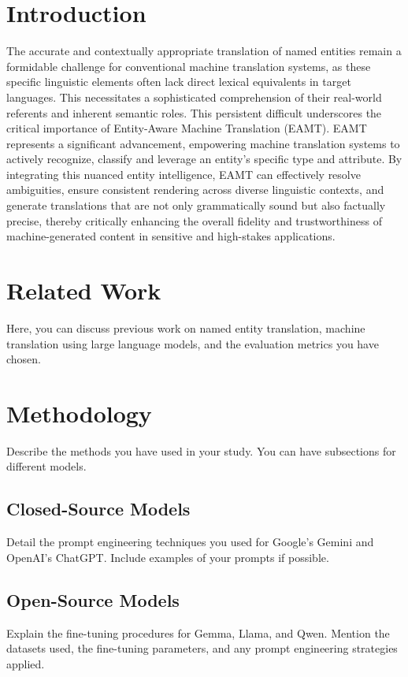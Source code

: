 \documentclass{ecai}
\begin{document}
\section{Introduction}
\label{sec:intro}
The accurate and contextually appropriate translation of named entities remain a formidable challenge
for conventional machine translation systems, as these specific linguistic elements often lack direct
lexical equivalents in target languages. This necessitates a sophisticated comprehension of their real-world
referents and inherent semantic roles. This persistent difficult underscores the critical importance of Entity-Aware
Machine Translation (EAMT). EAMT represents a significant advancement, empowering machine translation systems to actively
recognize, classify and leverage an entity's specific type and attribute. By integrating this nuanced entity intelligence, 
EAMT can effectively resolve ambiguities, ensure consistent rendering across diverse linguistic contexts, 
and generate translations that are not only grammatically sound but also factually precise, 
thereby critically enhancing the overall fidelity and trustworthiness of machine-generated content
 in sensitive and high-stakes applications.

\section{Related Work}
\label{sec:related}
Here, you can discuss previous work on named entity translation, machine translation using large language models, and the evaluation metrics you have chosen.

\section{Methodology}
\label{sec:methodology}
Describe the methods you have used in your study. You can have subsections for different models.

\subsection{Closed-Source Models}
Detail the prompt engineering techniques you used for Google's Gemini and OpenAI's ChatGPT. Include examples of your prompts if possible.

\subsection{Open-Source Models}
Explain the fine-tuning procedures for Gemma, Llama, and Qwen. Mention the datasets used, the fine-tuning parameters, and any prompt engineering strategies applied.
\end{document}
